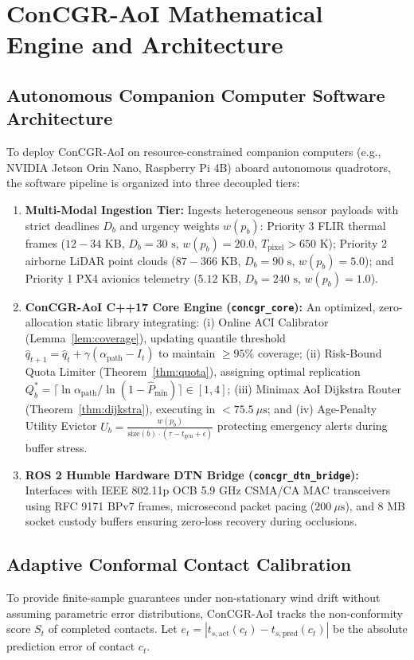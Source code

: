 \documentclass[preprint,12pt,5p,twocolumn]{elsarticle}
\begin{document}
\section{ConCGR-AoI Mathematical Engine and Architecture}
\label{sec:math_engine}

\subsection{Autonomous Companion Computer Software Architecture}
To deploy ConCGR-AoI on resource-constrained companion computers (e.g., NVIDIA Jetson Orin Nano, Raspberry Pi 4B) aboard autonomous quadrotors, the software pipeline is organized into three decoupled tiers:
\begin{enumerate}
    \item \textbf{Multi-Modal Ingestion Tier:} Ingests heterogeneous sensor payloads with strict deadlines $D_b$ and urgency weights $w(p_b)$: Priority 3 FLIR thermal frames ($12 - 34\text{ KB}$, $D_b = 30\text{ s}$, $w(p_b) = 20.0$, $T_{\mathrm{pixel}} > 650\text{ K}$); Priority 2 airborne LiDAR point clouds ($87 - 366\text{ KB}$, $D_b = 90\text{ s}$, $w(p_b) = 5.0$); and Priority 1 PX4 avionics telemetry ($5.12\text{ KB}$, $D_b = 240\text{ s}$, $w(p_b) = 1.0$).
    \item \textbf{ConCGR-AoI C++17 Core Engine (\texttt{concgr\_core}):} An optimized, zero-allocation static library integrating: (i) Online ACI Calibrator (Lemma~\ref{lem:coverage}), updating quantile threshold $\hat{q}_{t+1} = \hat{q}_t + \gamma(\alpha_{\mathrm{path}} - I_t)$ to maintain $\ge 95\%$ coverage; (ii) Risk-Bound Quota Limiter (Theorem~\ref{thm:quota}), assigning optimal replication $Q_b^* = \lceil \ln \alpha_{\mathrm{path}} / \ln(1 - \hat{P}_{\min}) \rceil \in [1, 4]$; (iii) Minimax AoI Dijkstra Router (Theorem~\ref{thm:dijkstra}), executing in $< 75.5\ \mu\text{s}$; and (iv) Age-Penalty Utility Evictor $U_b = \frac{w(p_b)}{\mathrm{size}(b) \cdot (\tau - t_{\mathrm{gen}} + \epsilon)}$ protecting emergency alerts during buffer stress.
    \item \textbf{ROS 2 Humble Hardware DTN Bridge (\texttt{concgr\_dtn\_bridge}):} Interfaces with IEEE 802.11p OCB 5.9 GHz CSMA/CA MAC transceivers using RFC 9171 BPv7 frames, microsecond packet pacing ($200\ \mu\text{s}$), and 8 MB socket custody buffers ensuring zero-loss recovery during occlusions.
\end{enumerate}

\subsection{Adaptive Conformal Contact Calibration}
To provide finite-sample guarantees under non-stationary wind drift without assuming parametric error distributions, ConCGR-AoI tracks the non-conformity score $S_t$ of completed contacts. Let $e_t = |t_{s,\text{act}}(c_t) - t_{s,\text{pred}}(c_t)|$ be the absolute prediction error of contact $c_t$. 
\end{document}
